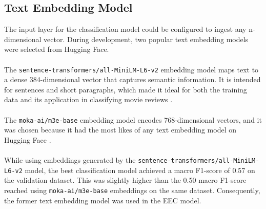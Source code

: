\documentclass[11pt]{article}
\begin{document}
\subsection{Text Embedding Model}
The input layer for the classification model could be configured to ingest any n-dimensional vector. During development, two popular text embedding models were selected from Hugging Face. \\ \\
The \texttt{sentence-transformers/all-MiniLM-L6-v2} embedding model maps text to a dense 384-dimensional vector that captures semantic information. It is intended for sentences and short paragraphs, which made it ideal for both the training data and its application in classifying movie reviews \cite{all-MiniLM-L6-v2}. \\ \\
The \texttt{moka-ai/m3e-base} embedding model encodes 768-dimensional vectors, and it was chosen because it had the most likes of any text embedding model on Hugging Face \cite{MokaMassiveMixedEmbedding}. \\ \\
While using embeddings generated by the \texttt{sentence-transformers/all-MiniLM-L6-v2} model, the best classification model achieved a macro F1-score of 0.57 on the validation dataset. This was slightly higher than the 0.50 macro F1-score reached using \texttt{moka-ai/m3e-base} embeddings on the same dataset. Consequently, the former text embedding model was used in the EEC model.
\end{document}

